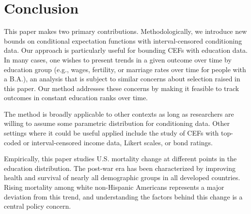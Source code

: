 \documentclass[12pt,letterpaper]{article}
\numberwithin{equation}{section}
\begin{document}
\section{Conclusion}
\label{sec:conclusion}





This paper makes two primary contributions. Methodologically, we introduce new bounds on conditional expectation functions with interval-censored conditioning data. Our approach is particularly useful for bounding CEFs with education data. In many cases, one wishes to present trends in a given outcome over time by education group (e.g., wages, fertility, or marriage rates over time for people with a B.A.), an analysis that is subject to similar concerns about selection raised in this paper. Our method addresses these concerns by making it feasible to track outcomes in constant education ranks over time.

The method is broadly applicable to other contexts as long as researchers are willing to assume some parametric distribution for conditioning data. Other settings where it could be useful applied include the study of CEFs with top-coded or interval-censored income data, Likert scales, or bond ratings.

Empirically, this paper studies U.S. mortality change at different points in the education distribution. The post-war era has been characterized by improving health and survival of nearly all demographic groups in all developed countries. Rising mortality among white non-Hispanic Americans represents a major deviation from this trend, and understanding the factors behind this change is a central policy concern.
\end{document}
